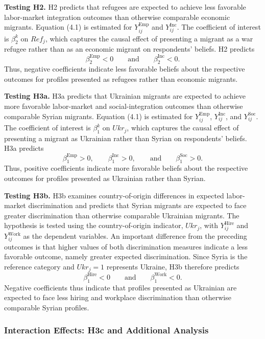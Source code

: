 \noindent\textbf{Testing H2.} H2 predicts that refugees are expected to achieve less favorable labor-market integration 
outcomes than otherwise comparable economic migrants. Equation (4.1) is estimated for \(Y_{ij}^{\mathrm{Emp}}\) and 
\(Y_{ij}^{\mathrm{Inc}}\). The coefficient of interest is \(\beta_{2}^{k}\) on \(Ref_j\), which captures the causal effect of 
presenting a migrant as a war refugee rather than as an economic migrant on respondents’ beliefs. H2 predicts
$$ \beta_{2}^{\mathrm{Emp}}<0 \qquad \text{and} \qquad \beta_{2}^{\mathrm{Inc}}<0. $$
Thus, negative coefficients indicate less favorable beliefs about the respective outcomes for profiles 
presented as refugees rather than economic migrants.\bigskip

\noindent\textbf{Testing H3a.} H3a predicts that Ukrainian migrants are expected to achieve more favorable labor-market 
and social-integration outcomes than otherwise comparable Syrian migrants. Equation (4.1) is estimated for 
\(Y_{ij}^{\mathrm{Emp}}\), \(Y_{ij}^{\mathrm{Inc}}\), and \(Y_{ij}^{\mathrm{Soc}}\). The coefficient of interest is 
\(\beta_{1}^{k}\) on \(Ukr_j\), which captures the causal effect of presenting a migrant as Ukrainian rather than 
Syrian on respondents’ beliefs. H3a predicts
$$ \beta_{1}^{\mathrm{Emp}}>0, \qquad \beta_{1}^{\mathrm{Inc}}>0, \qquad \text{and} \qquad \beta_{1}^{\mathrm{Soc}}>0. $$
Thus, positive coefficients indicate more favorable beliefs about the respective outcomes for profiles presented as 
Ukrainian rather than Syrian.\bigskip

\noindent\textbf{Testing H3b.} H3b examines country-of-origin differences in expected labor-market discrimination and 
predicts that Syrian migrants are expected to face greater discrimination than otherwise comparable Ukrainian migrants. 
The hypothesis is tested using the country-of-origin indicator, \(Ukr_j\), with \(Y_{ij}^{\mathrm{Hire}}\) and 
\(Y_{ij}^{\mathrm{Work}}\) as the dependent variables. An important difference from the preceding outcomes is that 
higher values of both discrimination measures indicate a less favorable outcome, namely greater expected discrimination. 
Since Syria is the reference category and \(Ukr_j=1\) represents Ukraine, H3b therefore predicts
$$ \beta_{1}^{\mathrm{Hire}}<0 \qquad \text{and} \qquad \beta_{1}^{\mathrm{Work}}<0. $$
Negative coefficients thus indicate that profiles presented as Ukrainian are expected to face less hiring and workplace 
discrimination than otherwise comparable Syrian profiles.

\subsubsection{Interaction Effects: H3c and Additional Analysis}

